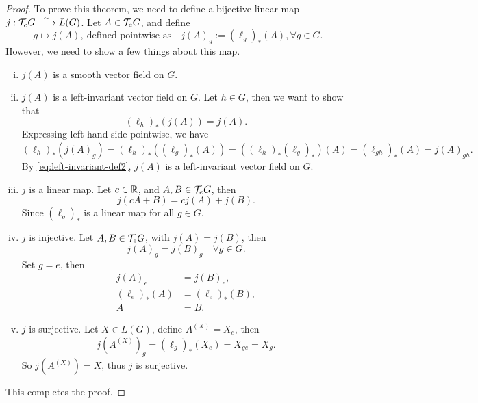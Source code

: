 \begin{proof}
    To prove this theorem, we need to define a bijective linear map \(j: \mathcal T_e G \xrightarrow{\ \sim\ } L(G)\). Let \(A \in \mathcal T_e G\), and define
    \begin{equation*}
        g \mapsto j(A),\ \text{defined pointwise as} \quad j(A)_g := (\ell_g)_*(A), \forall g \in G.
    \end{equation*}
    However, we need to show a few things about this map.
    \begin{enumerate}[(i)]
        \item \(j(A)\) is a smooth vector field on \(G\).
        \item \(j(A)\) is a left-invariant vector field on \(G\). Let \(h \in G\), then we want to show that
              \begin{equation*}
                  (\ell_h)_*(j(A)) = j(A).
              \end{equation*}
              Expressing left-hand side pointwise, we have
              \begin{equation*}
                  (\ell_h)_*(j(A)_g) = (\ell_h)_*((\ell_g)_*(A)) = ((\ell_h)_*(\ell_g)_*)(A) = (\ell_{g h})_*(A) = j(A)_{g h}.
              \end{equation*}
              By \cref{eq:left-invariant-def2}, \(j(A)\) is a left-invariant vector field on \(G\).

        \item \(j\) is a linear map. Let \(c \in \mathbb R\), and \(A, B \in \mathcal T_e G\), then
              \begin{equation*}
                  j(c A + B) = c j(A) + j(B).
              \end{equation*}
              Since \((\ell_g)_*\) is a linear map for all \(g \in G\).

        \item \(j\) is injective. Let \(A, B \in \mathcal T_e G\), with \(j(A) = j(B)\), then
              \begin{equation*}
                  j(A)_g = j(B)_g \quad \forall g \in G.
              \end{equation*}
              Set \(g = e\), then
              \begin{align*}
                  j(A)_e        & = j(B)_e,        \\
                  (\ell_e)_*(A) & = (\ell_e)_*(B), \\
                  A             & = B.
              \end{align*}

        \item \(j\) is surjective. Let \(X \in L(G)\), define \(A^{(X)} = X_e\), then
              \begin{equation*}
                  j(A^{(X)})_g = (\ell_g)_*(X_e) = X_{g e} = X_g.
              \end{equation*}
              So \(j(A^{(X)}) = X\), thus \(j\) is surjective.
    \end{enumerate}
    This completes the proof.
\end{proof}
